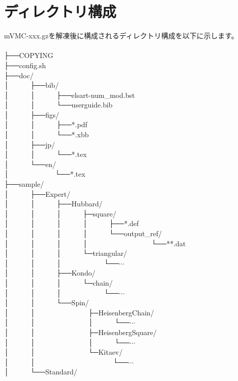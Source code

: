 \section{ディレクトリ構成}
mVMC-xxx.gzを解凍後に構成されるディレクトリ構成を以下に示します。\\
\\
├──COPYING\\
├──config.sh\\
├──doc/\\
│~~~~~~├──bib/\\
│~~~~~~│~~~~~~├──elsart-num\_mod.bst\\
│~~~~~~│~~~~~~└──userguide.bib\\
│~~~~~~├──figs/\\
│~~~~~~│~~~~~~├──*.pdf\\
│~~~~~~│~~~~~~└──*.xbb\\
│~~~~~~├──jp/\\
│~~~~~~│~~~~~~└──*.tex\\
│~~~~~~└──en/\\
│~~~~~~~~~~~~~└──*.tex\\
├──sample/\\
│~~~~~~├──Expert/\\
│~~~~~~│~~~~~~├──Hubbard/\\
│~~~~~~│~~~~~~│~~~~~~├─square/\\
│~~~~~~│~~~~~~│~~~~~~│~~~~~~├──*.def\\
│~~~~~~│~~~~~~│~~~~~~│~~~~~~└──output\_ref/\\
│~~~~~~│~~~~~~│~~~~~~│~~~~~~~~~~~~~~~~~~└──**.dat\\
│~~~~~~│~~~~~~│~~~~~~└─triangular/\\
│~~~~~~│~~~~~~│~~~~~~~~~~~~└──$\cdots$\\
│~~~~~~│~~~~~~├──Kondo/\\
│~~~~~~│~~~~~~│~~~~~~└─chain/\\
│~~~~~~│~~~~~~│~~~~~~~~~~~~└──$\cdots$\\
│~~~~~~│~~~~~~└──Spin/\\
│~~~~~~│~~~~~~~~~~~~~~~├─HeisenbergChain/\\
│~~~~~~│~~~~~~~~~~~~~~~│~~~~~~└──$\cdots$\\
│~~~~~~│~~~~~~~~~~~~~~~├─HeisenbergSquare/\\
│~~~~~~│~~~~~~~~~~~~~~~│~~~~~~└──$\cdots$\\
│~~~~~~│~~~~~~~~~~~~~~~└─Kitaev/\\
│~~~~~~│~~~~~~~~~~~~~~~~~~~~~~└──$\cdots$\\
│~~~~~~└──Standard/\\
